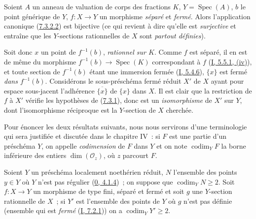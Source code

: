 \begin{proposition}[7.3.3]
\label{II.7.3.3-fr}
Soient $A$ un anneau de valuation de corps des fractions $K$,
$Y=\operatorname{Spec}(A)$, $b$ le point générique de $Y$, $f:X\to Y$ un
morphisme \emph{séparé} et \emph{fermé}. Alors l'application canonique
(\hyperref[II.7.3.2.2-fr]{7.3.2.2}) est bijective (ce qui revient à dire
qu'elle est \emph{surjective} et entraîne que les $Y$-sections rationnelles de
$X$ sont \emph{partout définies}).
\end{proposition}

Soit donc $x$ un point de $f^{-1}(b)$, \emph{rationnel sur $K$}. Comme $f$ est
séparé, il en est de même du morphisme
$f^{-1}(b)\to\operatorname{Spec}(K)$ correspondant à $f$
(\hyperref[I.5.5.1-fr]{I, 5.5.1, (iv)}), et toute section de $f^{-1}(b)$ étant
une immersion fermée (\hyperref[I.5.4.6-fr]{I, 5.4.6}), $\{x\}$ est fermé
\emph{dans $f^{-1}(b)$}. Considérons le sous-préschéma fermé réduit $X'$ de
$X$ ayant pour espace sous-jacent l'adhérence $\overline{\{x\}}$ de $\{x\}$
dans $X$. Il est clair que la restriction de $f$ à $X'$ vérifie les hypothèses
de (\hyperref[II.7.3.1-fr]{7.3.1}), donc est un \emph{isomorphisme} de $X'$ sur
$Y$, dont l'isomorphisme réciproque est la $Y$-section de $X$ cherchée.

\begin{env}[7.3.4]
\label{II.7.3.4-fr}
Pour énoncer les deux résultats suivants, nous nous servirons d'une
terminologie qui sera justifiée et discutée dans le chapitre IV~: si $F$ est
une partie
d'un préschéma $Y$, on appelle \emph{codimension} de $F$ dans $Y$ et on note
$\operatorname{codim}_YF$ la borne inférieure des entiers
$\dim(\mathcal{O}_z)$, où $z$ parcourt $F$.
\end{env}

\begin{corollary}[7.3.5]
\label{II.7.3.5-fr}
Soient $Y$ un préschéma localement noethérien réduit, $N$ l'ensemble des
points $y\in Y$ où $Y$ n'est pas régulier
(\hyperref[0.4.1.4-fr]{0, 4.1.4})~; on suppose que
$\operatorname{codim}_YN\geq2$. Soit $f:X\to Y$ un morphisme de type fini,
séparé et fermé et soit $g$ une $Y$-section rationnelle de $X$~; si $Y'$ est
l'ensemble des points de $Y$ où $g$ n'est pas définie (ensemble qui est
\emph{fermé} (\hyperref[I.7.2.1-fr]{I, 7.2.1})) on a
$\operatorname{codim}_YY'\geq2$.
\end{corollary}

